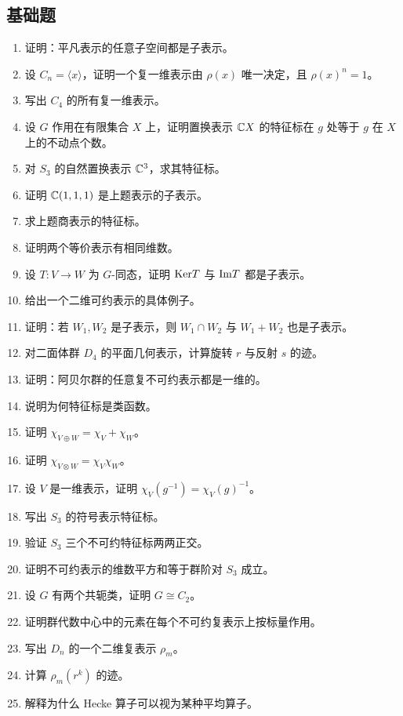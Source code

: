 \subsection*{基础题}
\begin{enumerate}[label=\textbf{\arabic*.}, leftmargin=*, itemsep=0.5em]
\item \basic 证明：平凡表示的任意子空间都是子表示。
\item \basic 设 $C_n=\langle x\rangle$，证明一个复一维表示由 $\rho(x)$ 唯一决定，且 $\rho(x)^n=1$。
\item \basic 写出 $C_4$ 的所有复一维表示。
\item \basic 设 $G$ 作用在有限集合 $X$ 上，证明置换表示 $\mathbb{C} X$ 的特征标在 $g$ 处等于 $g$ 在 $X$ 上的不动点个数。
\item \basic 对 $S_3$ 的自然置换表示 $\mathbb{C}^3$，求其特征标。
\item \basic 证明 $\mathbb{C}(1,1,1)$ 是上题表示的子表示。
\item \basic 求上题商表示的特征标。
\item \basic 证明两个等价表示有相同维数。
\item \basic 设 $T:V\to W$ 为 $G$-同态，证明 $\mathrm{Ker} T$ 与 $\mathrm{Im} T$ 都是子表示。
\item \basic 给出一个二维可约表示的具体例子。
\item \basic 证明：若 $W_1,W_2$ 是子表示，则 $W_1\cap W_2$ 与 $W_1+W_2$ 也是子表示。
\item \basic 对二面体群 $D_4$ 的平面几何表示，计算旋转 $r$ 与反射 $s$ 的迹。
\item \basic 证明：阿贝尔群的任意复不可约表示都是一维的。
\item \basic 说明为何特征标是类函数。
\item \basic 证明 $\chi_{V\oplus W}=\chi_V+\chi_W$。
\item \basic 证明 $\chi_{V\otimes W}=\chi_V\chi_W$。
\item \basic 设 $V$ 是一维表示，证明 $\chi_V(g^{-1})=\chi_V(g)^{-1}$。
\item \basic 写出 $S_3$ 的符号表示特征标。
\item \basic 验证 $S_3$ 三个不可约特征标两两正交。
\item \basic 证明不可约表示的维数平方和等于群阶对 $S_3$ 成立。
\item \basic 设 $G$ 有两个共轭类，证明 $G\cong C_2$。
\item \basic 证明群代数中心中的元素在每个不可约复表示上按标量作用。
\item \basic 写出 $D_n$ 的一个二维复表示 $\rho_m$。
\item \basic 计算 $\rho_m(r^k)$ 的迹。
\item \basic 解释为什么 Hecke 算子可以视为某种平均算子。
\end{enumerate}
